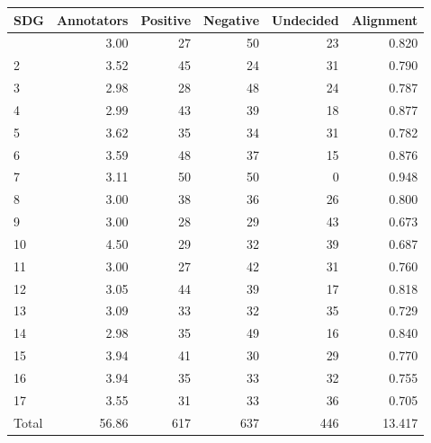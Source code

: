 \begin{table}[t]
\fontsize{12.0pt}{14.4pt}\selectfont
\begin{tabular*}{\linewidth}{@{\extracolsep{\fill}}lrrrrr}
\toprule
SDG & Annotators & Positive & Negative & Undecided & Alignment \\ 
\midrule\addlinespace[2.5pt]
1 & 3.00 & 27 & 50 & 23 & 0.820 \\ 
2 & 3.52 & 45 & 24 & 31 & 0.790 \\ 
3 & 2.98 & 28 & 48 & 24 & 0.787 \\ 
4 & 2.99 & 43 & 39 & 18 & 0.877 \\ 
5 & 3.62 & 35 & 34 & 31 & 0.782 \\ 
6 & 3.59 & 48 & 37 & 15 & 0.876 \\ 
7 & 3.11 & 50 & 50 & 0 & 0.948 \\ 
8 & 3.00 & 38 & 36 & 26 & 0.800 \\ 
9 & 3.00 & 28 & 29 & 43 & 0.673 \\ 
10 & 4.50 & 29 & 32 & 39 & 0.687 \\ 
11 & 3.00 & 27 & 42 & 31 & 0.760 \\ 
12 & 3.05 & 44 & 39 & 17 & 0.818 \\ 
13 & 3.09 & 33 & 32 & 35 & 0.729 \\ 
14 & 2.98 & 35 & 49 & 16 & 0.840 \\ 
15 & 3.94 & 41 & 30 & 29 & 0.770 \\ 
16 & 3.94 & 35 & 33 & 32 & 0.755 \\ 
17 & 3.55 & 31 & 33 & 36 & 0.705 \\ 
Total & 56.86 & 617 & 637 & 446 & 13.417 \\ 
\bottomrule
\end{tabular*}
\end{table}

